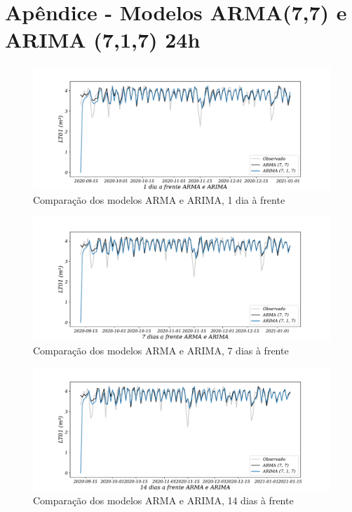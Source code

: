 
\section{Ap\^endice - Modelos ARMA(7,7) e ARIMA (7,1,7) 24h}\label{sec:armaarima24}

\begin{figure}[H]
	\centering
	\caption{Comparação dos modelos ARMA e ARIMA, 1 dia à frente }
	\label{fig:1-ARMA-ARIMA24}
	\includegraphics[width=1\linewidth]{Apendices/Figuras/modelagem-24h/1-ARMA-ARIMA}
	
\end{figure}

\begin{figure}[H]
	\centering
	\caption{Comparação dos modelos ARMA e ARIMA, 7 dias à frente }
	\label{fig:10-ARMA-ARIMA24}
	\includegraphics[width=1\linewidth]{Apendices/Figuras/modelagem-24h/7-ARMA-ARIMA}
	
\end{figure}


\begin{figure}[H]
	\centering
	\caption{Comparação dos modelos ARMA e ARIMA, 14 dias à frente }
	\label{fig:30-ARMA-ARIMA24}
	\includegraphics[width=1\linewidth]{Apendices/Figuras/modelagem-24h/14-ARMA-ARIMA}
\end{figure}

